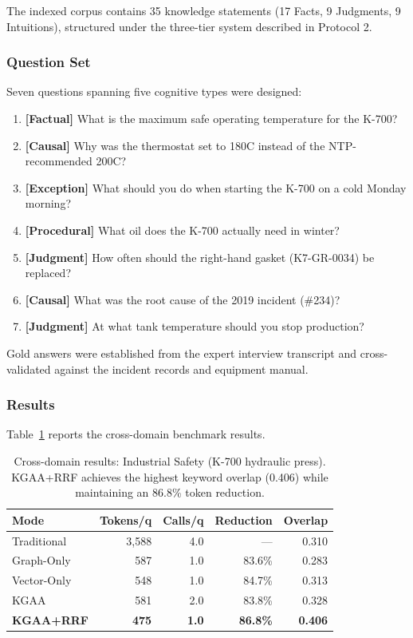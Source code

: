 \documentclass[11pt,a4paper]{article}
\begin{document}
The indexed corpus contains 35 knowledge statements (17 Facts, 9 Judgments, 9 Intuitions), structured under the three-tier system described in Protocol 2.

\subsubsection{Question Set}

Seven questions spanning five cognitive types were designed:

\begin{enumerate}
    \item \textbf{[Factual]} What is the maximum safe operating temperature for the K-700?
    \item \textbf{[Causal]} Why was the thermostat set to 180\textdegree C instead of the NTP-recommended 200\textdegree C?
    \item \textbf{[Exception]} What should you do when starting the K-700 on a cold Monday morning?
    \item \textbf{[Procedural]} What oil does the K-700 actually need in winter?
    \item \textbf{[Judgment]} How often should the right-hand gasket (K7-GR-0034) be replaced?
    \item \textbf{[Causal]} What was the root cause of the 2019 incident (\#234)?
    \item \textbf{[Judgment]} At what tank temperature should you stop production?
\end{enumerate}

Gold answers were established from the expert interview transcript and cross-validated against the incident records and equipment manual.

\subsubsection{Results}

Table~\ref{tab:crossdomain} reports the cross-domain benchmark results.

\begin{table}[ht]
\centering
\caption{Cross-domain results: Industrial Safety (K-700 hydraulic press). KGAA+RRF achieves the highest keyword overlap (0.406) while maintaining an 86.8\% token reduction.}
\label{tab:crossdomain}
\begin{tabular}{lrrrr}
\hline
\textbf{Mode} & \textbf{Tokens/q} & \textbf{Calls/q} & \textbf{Reduction} & \textbf{Overlap} \\
\hline
Traditional & 3,588 & 4.0 & --- & 0.310 \\
Graph-Only & 587 & 1.0 & 83.6\% & 0.283 \\
Vector-Only & 548 & 1.0 & 84.7\% & 0.313 \\
KGAA & 581 & 2.0 & 83.8\% & 0.328 \\
\textbf{KGAA+RRF} & \textbf{475} & \textbf{1.0} & \textbf{86.8\%} & \textbf{0.406} \\
\hline
\end{tabular}
\end{table}
\end{document}

